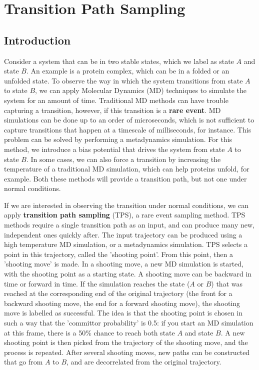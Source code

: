 \documentclass[]{article}
\begin{document}
\section*{Transition Path Sampling}

\subsection*{Introduction}

Consider a system that can be in two stable states, which we label as state $A$ and state $B$. An example is a protein complex, which can be in a folded or an unfolded state. To observe the way in which the system transitions from state $A$ to state $B$, we can apply Molecular Dynamics (MD) techniques to simulate the system for an amount of time. Traditional MD methods can have trouble capturing a transition, however, if this transition is a \textbf{rare event}. MD simulations can be done up to an order of microseconds, which is not sufficient to capture transitions that happen at a timescale of milliseconds, for instance. This problem can be solved by performing a metadynamics simulation. For this method, we introduce a bias potential that drives the system from state $A$ to state $B$. In some cases, we can also force a transition by increasing the temperature of a traditional MD simulation, which can help proteins unfold, for example. Both these methods will provide a transition path, but not one under normal conditions. 

If we are interested in observing the transition under normal conditions, we can apply \textbf{transition path sampling} (TPS), a rare event sampling method. TPS methods require a single transition path as an input, and can produce many new, independent ones quickly after. The input trajectory can be produced using a high temperature MD simulation, or a metadynamics simulation. TPS selects a point in this trajectory, called the 'shooting point'. From this point, then a 'shooting move' is made. In a shooting move, a new MD simulation is started, with the shooting point as a starting state. A shooting move can be backward in time or forward in time. If the simulation reaches the state ($A$ or $B$) that was reached at the corresponding end of the original trajectory (the front for a backward shooting move, the end for a forward shooting move), the shooting move is labelled as successful. The idea is that the shooting point is chosen in such a way that the 'committor probability' is 0.5: if you start an MD simulation at this frame, there is a 50\% chance to reach both state $A$ and state $B$. A new shooting point is then picked from the trajectory of the shooting move, and the process is repeated. After several shooting moves, new paths can be constructed that go from $A$ to $B$, and are decorrelated from the original trajectory.
\end{document}
